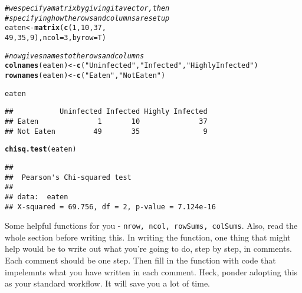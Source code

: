 \documentclass{article}\usepackage[]{graphicx}\usepackage[]{color}
\makeatletter
\newcommand{\hlnum}[1]{\textcolor[rgb]{0.686,0.059,0.569}{#1}}%
\newcommand{\hlstr}[1]{\textcolor[rgb]{0.192,0.494,0.8}{#1}}%
\newcommand{\hlcom}[1]{\textcolor[rgb]{0.678,0.584,0.686}{\textit{#1}}}%
\newcommand{\hlstd}[1]{\textcolor[rgb]{0.345,0.345,0.345}{#1}}%
\newcommand{\hlkwb}[1]{\textcolor[rgb]{0.69,0.353,0.396}{#1}}%
\newcommand{\hlkwc}[1]{\textcolor[rgb]{0.333,0.667,0.333}{#1}}%
\newcommand{\hlkwd}[1]{\textcolor[rgb]{0.737,0.353,0.396}{\textbf{#1}}}%
\newenvironment{kframe}{%
 \def\at@end@of@kframe{}%
 \ifinner\ifhmode%
  \def\at@end@of@kframe{\end{minipage}}%
  \begin{minipage}{\columnwidth}%
 \fi\fi%
 \def\FrameCommand##1{\hskip\@totalleftmargin \hskip-\fboxsep
 \colorbox{shadecolor}{##1}\hskip-\fboxsep
     \hskip-\linewidth \hskip-\@totalleftmargin \hskip\columnwidth}%
 \MakeFramed {\advance\hsize-\width
   \@totalleftmargin\z@ \linewidth\hsize
   \@setminipage}}%
 {\par\unskip\endMakeFramed%
 \at@end@of@kframe}
\newenvironment{knitrout}{}{} %
\makeatother
\begin{document}
\begin{knitrout}
\color{fgcolor}\begin{kframe}
\begin{alltt}
\hlcom{#we specify a matrix by giving it a vector, then}
\hlcom{#specifying how the rows and columns are setup}
\hlstd{eaten} \hlkwb{<-} \hlkwd{matrix}\hlstd{(}\hlkwd{c}\hlstd{(} \hlnum{1}\hlstd{,} \hlnum{10}\hlstd{,} \hlnum{37}\hlstd{,}
                   \hlnum{49}\hlstd{,} \hlnum{35}\hlstd{,} \hlnum{9}\hlstd{),} \hlkwc{ncol}\hlstd{=}\hlnum{3}\hlstd{,} \hlkwc{byrow}\hlstd{=T)}

\hlcom{#now gives names to the rows and columns}
\hlkwd{colnames}\hlstd{(eaten)} \hlkwb{<-} \hlkwd{c}\hlstd{(}\hlstr{"Uninfected"}\hlstd{,} \hlstr{"Infected"}\hlstd{,} \hlstr{"Highly Infected"}\hlstd{)}
\hlkwd{rownames}\hlstd{(eaten)} \hlkwb{<-} \hlkwd{c}\hlstd{(}\hlstr{"Eaten"}\hlstd{,} \hlstr{"Not Eaten"}\hlstd{)}

\hlstd{eaten}
\end{alltt}
\begin{verbatim}
##           Uninfected Infected Highly Infected
## Eaten              1       10              37
## Not Eaten         49       35               9
\end{verbatim}
\begin{alltt}
\hlkwd{chisq.test}\hlstd{(eaten)}
\end{alltt}
\begin{verbatim}
## 
## 	Pearson's Chi-squared test
## 
## data:  eaten
## X-squared = 69.756, df = 2, p-value = 7.124e-16
\end{verbatim}
\end{kframe}
\end{knitrout}

Some helpful functions for you - {\tt nrow, ncol, rowSums, colSums}.  Also, read the whole section before writing this.  In writing the function, one thing that might help would be to write out what you're going to do, step by step, in comments.  Each comment should be one step.  Then fill in the function with code that impelemnts what you have written in each comment.  Heck, ponder adopting this as your standard workflow.  It will save you a lot of time.
\end{document}
